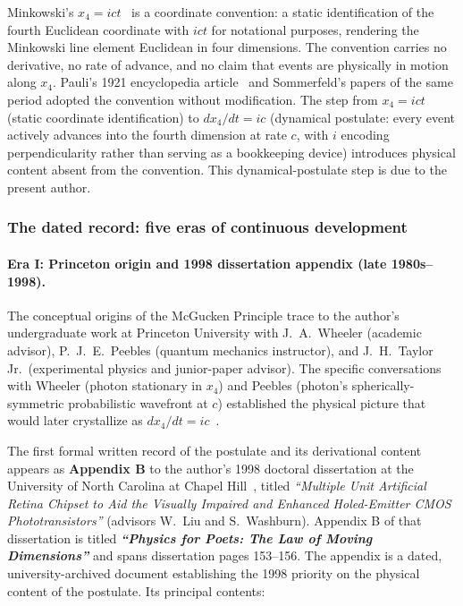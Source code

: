 \documentclass[11pt,a4paper]{article}
\begin{document}
Minkowski's $x_4 = ict$~\cite{minkowski1908} is a coordinate convention: a static identification of the fourth Euclidean coordinate with $ict$ for notational purposes, rendering the Minkowski line element Euclidean in four dimensions. The convention carries no derivative, no rate of advance, and no claim that events are physically in motion along $x_4$. Pauli's 1921 encyclopedia article~\cite{pauli1921} and Sommerfeld's papers of the same period adopted the convention without modification. The step from $x_4 = ict$ (static coordinate identification) to $dx_4/dt = ic$ (dynamical postulate: every event actively advances into the fourth dimension at rate $c$, with $i$ encoding perpendicularity rather than serving as a bookkeeping device) introduces physical content absent from the convention. This dynamical-postulate step is due to the present author.

\subsubsection{The dated record: five eras of continuous development}

\paragraph{Era I: Princeton origin and 1998 dissertation appendix (late 1980s--1998).}\label{sec:era1} The conceptual origins of the McGucken Principle trace to the author's undergraduate work at Princeton University with J.\ A.\ Wheeler (academic advisor), P.\ J.\ E.\ Peebles (quantum mechanics instructor), and J.\ H.\ Taylor Jr.\ (experimental physics and junior-paper advisor). The specific conversations with Wheeler (photon stationary in $x_4$) and Peebles (photon's spherically-symmetric probabilistic wavefront at $c$) established the physical picture that would later crystallize as $dx_4/dt = ic$~\cite{mcguckenprincetonafternoons}.

The first formal written record of the postulate and its derivational content appears as \textbf{Appendix B} to the author's 1998 doctoral dissertation at the University of North Carolina at Chapel Hill~\cite{mcguckendissertation}, titled \emph{``Multiple Unit Artificial Retina Chipset to Aid the Visually Impaired and Enhanced Holed-Emitter CMOS Phototransistors''} (advisors W.\ Liu and S.\ Washburn). Appendix B of that dissertation is titled \textbf{\emph{``Physics for Poets: The Law of Moving Dimensions''}} and spans dissertation pages 153--156. The appendix is a dated, university-archived document establishing the 1998 priority on the physical content of the postulate. Its principal contents:
\end{document}
